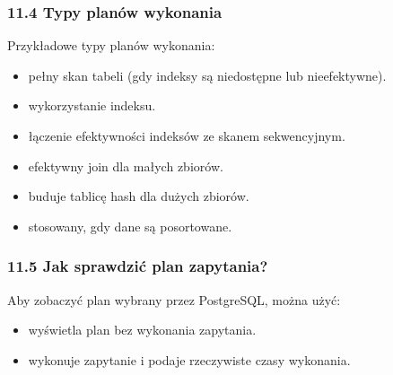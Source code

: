 \documentclass[a4paper,11pt,openany,english]{sphinxmanual}
\begin{document}
\subsubsection{11.4 Typy planów wykonania}
\label{\detokenize{rozdzial2/Konfiguracja_baz_danych/Konfiguracja_baz_danych:typy-planow-wykonania}}
\sphinxAtStartPar
Przykładowe typy planów wykonania:
\begin{itemize}
\item {} 
\sphinxAtStartPar
{} \textendash{} pełny skan tabeli (gdy indeksy są niedostępne lub nieefektywne).

\item {} 
\sphinxAtStartPar
{} \textendash{} wykorzystanie indeksu.

\item {} 
\sphinxAtStartPar
{} \textendash{} łączenie efektywności indeksów ze skanem sekwencyjnym.

\item {} 
\sphinxAtStartPar
{} \textendash{} efektywny join dla małych zbiorów.

\item {} 
\sphinxAtStartPar
{} \textendash{} buduje tablicę hash dla dużych zbiorów.

\item {} 
\sphinxAtStartPar
{} \textendash{} stosowany, gdy dane są posortowane.

\end{itemize}


\subsubsection{11.5 Jak sprawdzić plan zapytania?}
\label{\detokenize{rozdzial2/Konfiguracja_baz_danych/Konfiguracja_baz_danych:jak-sprawdzic-plan-zapytania}}
\sphinxAtStartPar
Aby zobaczyć plan wybrany przez PostgreSQL, można użyć:

\begin{sphinxVerbatim}[commandchars=\\\{\}]
         
\end{sphinxVerbatim}
\begin{itemize}
\item {} 
\sphinxAtStartPar
{} \textendash{} wyświetla plan bez wykonania zapytania.

\item {} 
\sphinxAtStartPar
{} \textendash{} wykonuje zapytanie i podaje rzeczywiste czasy wykonania.

\end{itemize}
\end{document}
